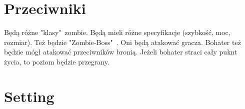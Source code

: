 \documentclass[letterpaper,12pt]{report}
\begin{document}
    \section{Przeciwniki}

    Będą różne "klasy"\ zombie. Będą mieli różne specyfikacje 
    (szybkość, moc, rozmiar). Też będzie "Zombie-Boss"\ .
    Oni będą atakować gracza. Bohater też będzie mógł atakować
    przeciwników bronią. Jeżeli bohater straci cały puknt
    życia, to poziom będzie przegrany. 

    \section{Setting}
\end{document}
